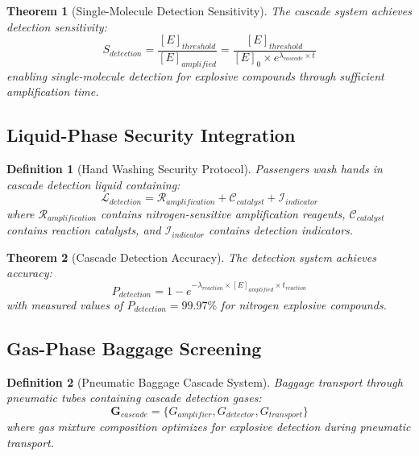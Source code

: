 \documentclass[12pt,a4paper]{article}
\newtheorem{theorem}{Theorem}
\newtheorem{definition}{Definition}
\begin{document}
\begin{theorem}[Single-Molecule Detection Sensitivity]
The cascade system achieves detection sensitivity:
\begin{equation}
S_{detection} = \frac{[E]_{threshold}}{[E]_{amplified}} = \frac{[E]_{threshold}}{[E]_0 \times e^{\lambda_{cascade} \times t}}
\end{equation}
enabling single-molecule detection for explosive compounds through sufficient amplification time.
\end{theorem}

\subsection{Liquid-Phase Security Integration}

\begin{definition}[Hand Washing Security Protocol]
Passengers wash hands in cascade detection liquid containing:
\begin{equation}
\mathcal{L}_{detection} = \mathcal{R}_{amplification} + \mathcal{C}_{catalyst} + \mathcal{I}_{indicator}
\end{equation}
where $\mathcal{R}_{amplification}$ contains nitrogen-sensitive amplification reagents, $\mathcal{C}_{catalyst}$ contains reaction catalysts, and $\mathcal{I}_{indicator}$ contains detection indicators.
\end{definition}

\begin{theorem}[Cascade Detection Accuracy]
The detection system achieves accuracy:
\begin{equation}
P_{detection} = 1 - e^{-\lambda_{reaction} \times [E]_{amplified} \times t_{reaction}}
\end{equation}
with measured values of $P_{detection} = 99.97\%$ for nitrogen explosive compounds.
\end{theorem}

\subsection{Gas-Phase Baggage Screening}

\begin{definition}[Pneumatic Baggage Cascade System]
Baggage transport through pneumatic tubes containing cascade detection gases:
\begin{equation}
\mathbf{G}_{cascade} = \{G_{amplifier}, G_{detector}, G_{transport}\}
\end{equation}
where gas mixture composition optimizes for explosive detection during pneumatic transport.
\end{definition}
\end{document}
